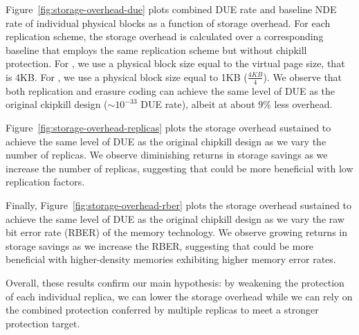 Figure~\ref{fig:storage-overhead-due} plots combined DUE rate and baseline NDE rate of individual physical blocks as a function of storage overhead.
For each replication scheme, the storage overhead is calculated over a corresponding baseline that employs the same replication scheme but without chipkill protection. 
For \chipkillrep, we use a physical block size equal to the virtual page size, that is 4KB.
For \chipkillec, we use a physical block size equal to 1KB ($\frac{4KB}{4}$).
We observe that both replication and erasure coding can achieve the same level of DUE as the original ckipkill design ($\sim10^{-33}$ DUE rate), albeit at about $9\%$ less overhead.

Figure~\ref{fig:storage-overhead-replicas} plots the storage overhead sustained to achieve the same level of DUE as the original chipkill design as we vary the number of replicas.
We observe diminishing returns in storage savings as we increase the number of replicas, suggesting that \ramp could be more beneficial with low replication factors. 

Finally, Figure~\ref{fig:storage-overhead-rber} plots the storage overhead sustained to achieve the same level of DUE as the original chipkill design as we vary the raw bit error rate (RBER) of the memory technology.
We observe growing returns in storage savings as we increase the RBER, suggesting that \ramp could be more beneficial with higher-density memories exhibiting higher memory error rates. 

Overall, these results confirm our main hypothesis: by weakening the protection of each individual replica, we can lower the storage overhead while we can rely on the combined protection conferred by multiple replicas to meet a stronger protection target.


